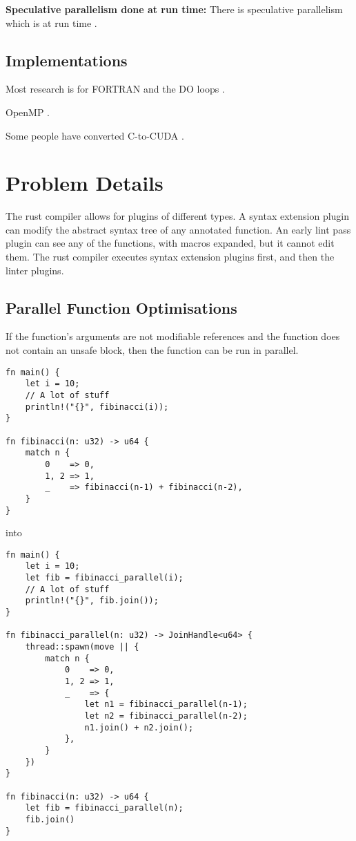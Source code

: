 \documentclass[conference]{IEEEtran}
\begin{document}
\textbf{Speculative parallelism done at run time:}
There is speculative parallelism which is at run time \parencite{Yiapanis2015}.

\subsection{Implementations}
Most research is for FORTRAN and the DO loops \parencite{Banerjee1993}.

OpenMP \parencite{Dagum1998,Lam2011}.

Some people have converted C-to-CUDA \parencite{Baskaran2010, Verdoolaege2013}.

\section{Problem Details}

The rust compiler allows for plugins of different types. A syntax extension plugin can modify the abstract syntax tree of any annotated function. An early lint pass plugin can see any of the functions, with macros expanded, but it cannot edit them. The rust compiler executes syntax extension plugins first, and then the linter plugins.


\subsection{Parallel Function Optimisations}
If the function's arguments are not modifiable references and the function does not contain an unsafe block, then the function can be run in parallel.

\begin{verbatim}
fn main() {
    let i = 10;
    // A lot of stuff
    println!("{}", fibinacci(i));
}

fn fibinacci(n: u32) -> u64 {
    match n {
        0    => 0,
        1, 2 => 1,
        _    => fibinacci(n-1) + fibinacci(n-2),
    }
}
\end{verbatim}
into
\begin{verbatim}
fn main() {
    let i = 10;
    let fib = fibinacci_parallel(i);
    // A lot of stuff
    println!("{}", fib.join());
}

fn fibinacci_parallel(n: u32) -> JoinHandle<u64> {
    thread::spawn(move || {
        match n {
            0    => 0,
            1, 2 => 1,
            _    => {
                let n1 = fibinacci_parallel(n-1);
                let n2 = fibinacci_parallel(n-2);
                n1.join() + n2.join();
            },
        }
    })
}

fn fibinacci(n: u32) -> u64 {
    let fib = fibinacci_parallel(n);
    fib.join()
}
\end{verbatim}
\end{document}
